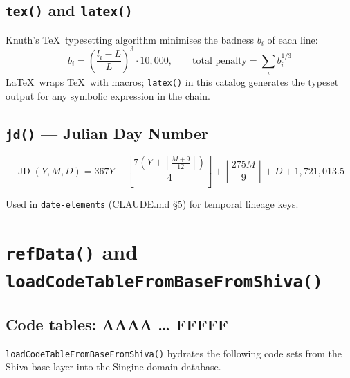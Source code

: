 \documentclass[12pt,a4paper]{article}
\DeclareMathOperator{\JD}{JD}
\begin{document}
\subsection{\texttt{tex()} and \texttt{latex()}}

Knuth's \TeX\ typesetting algorithm minimises the badness $b_i$ of each line:
\[
  b_i = \left(\frac{l_i - L}{L}\right)^3 \cdot 10{,}000, \qquad
  \text{total penalty} = \sum_i b_i^{1/3}
\]
\LaTeX\ wraps \TeX\ with macros; \texttt{latex()} in this catalog generates
the typeset output for any symbolic expression in the chain.

\subsection{\texttt{jd()} — Julian Day Number}

\[
  \JD(Y,M,D) = 367Y - \left\lfloor \frac{7\left(Y + \left\lfloor\frac{M+9}{12}\right\rfloor\right)}{4} \right\rfloor
  + \left\lfloor \frac{275M}{9} \right\rfloor + D + 1{,}721{,}013.5
\]

Used in \texttt{date-elements} (CLAUDE.md §5) for temporal lineage keys.

\section{\texttt{refData()} and \texttt{loadCodeTableFromBaseFromShiva()}}
\label{sec:refdata}

\subsection{Code tables: AAAA \ldots{} FFFFF}

\texttt{loadCodeTableFromBaseFromShiva()} hydrates the following
code sets from the Shiva base layer into the Singine domain database.
\end{document}
